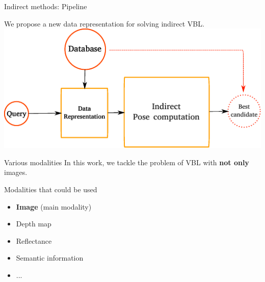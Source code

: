 \begin{frame}{Indirect methods: Pipeline}
	
	We propose a new data representation for solving indirect VBL.
	\vfill	
	\includegraphics{vect/keys_comp_indirect.pdf}
	
\end{frame}

\begin{frame}{Various modalities}
	In this work, we tackle the problem of VBL with \textbf{not only} images.
	\vfill
	\begin{minipage}{0.55\linewidth}
		\begin{block}{Modalities that could be used}
			\begin{itemize}
				\item<1-> \textbf{Image} (main modality)
				\item<2-> Depth map
				\item<3-> Reflectance
				\item<4> Semantic information
				\item<4> ...
			\end{itemize}
		\end{block}
	\end{minipage}
	\hfill
	\begin{minipage}{0.4\linewidth}
		\centering
	\end{minipage}
\end{frame}

